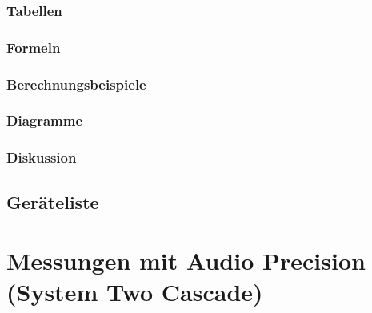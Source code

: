 \documentclass[12pt,a4paper,ngerman]{article}
\begin{document}
\subsubsection{Tabellen}

\subsubsection{Formeln}

\subsubsection{Berechnungsbeispiele}

\subsubsection{Diagramme}

\subsubsection{Diskussion}

\subsection{Geräteliste}

\section{Messungen mit Audio Precision (System Two Cascade)}


   
\end{document}
